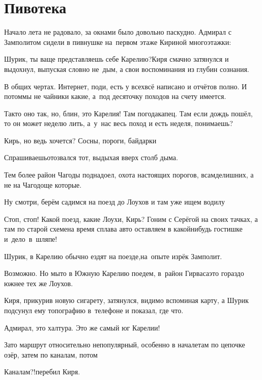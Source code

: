 \chapter{Пивотека}
\vepsianrose

Начало лета не радовало, за окнами было довольно паскудно. Адмирал с Замполитом сидели в пивнушке на~первом этаже Кириной многоэтажки:

\diagdash Шурик, ты ваще представляешь себе Карелию?\mdash Киря смачно затянулся и выдохнул, выпуская словно не~дым, а свои воспоминания из глубин сознания.

\diagdash В общих чертах. Интернет, поди, есть у всех\mdash всё написано и отчётов полно. И потом\mdash мы не чайники какие, а~под десяточку походов на счету имеется. %

\diagdash Так\sdash то оно так, но, блин, это Карелия! Там погода\mdash капец. Там если дождь пошёл, то он может неделю лить, а~у~нас весь поход и есть неделя, понимаешь?

\diagdash Кирь, но ведь хочется? Сосны, пороги, байдарки\myldots{}

\diagdash Спрашиваешь\myldots{}\mdash отозвался тот, выдыхая вверх столб дыма.

\diagdash Тем более район Чагоды поднадоел, охота настоящих порогов, всамделишних, а не на Чагодоще которые.

\diagdash Ну смотри, берём садимся на поезд до Лоухов и там уже ищем водилу\myldots{}

\diagdash Стоп, стоп! Какой поезд, какие Лоухи, Кирь? Гоним с Серёгой на своих тачках, а там по старой схеме\mdash на время сплава авто оставляем в какой\sdash нибудь гостишке и~дело~в~шляпе!

\diagdash Шурик, в Карелию обычно ездят на поезде,\mdash на~опыте изрёк Замполит.

\diagdash Возможно. Но мы\sdash то в Южную Карелию поедем, в~район Гирваса\mdash это гораздо южнее тех же Лоухов.

Киря, прикурив новую сигарету, затянулся, видимо вспоминая карту, а Шурик подсунул ему топографию в~телефоне и показал, где что.

\diagdash Адмирал, это халтура. Это же самый юг Карелии!

\diagdash Зато маршрут относительно непопулярный, особенно в начале\mdash там по цепочке озёр, затем по каналам, потом\myldots{}

\diagdash Каналам?!\mdash перебил Киря.

